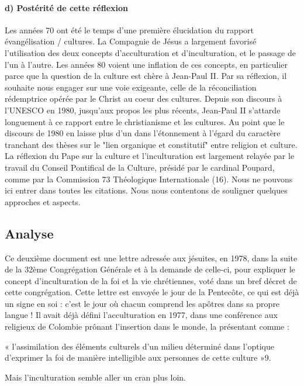 \paragraph{d) Postérité de cette réflexion
}
Les années 70 ont été le temps d'une première élucidation du rapport
évangélisation / cultures. La Compagnie de Jésus a largement favorisé l'utilisation des
deux concepts d'acculturation et d'inculturation, et le passage de l'un à l'autre. Les
années 80 voient une inflation de ces concepts, en particulier parce que la question de la
culture est chère à Jean-Paul II. Par sa réflexion, il souhaite nous engager sur une voie
exigeante, celle de la réconciliation rédemptrice opérée par le Christ au coeur des cultures.
Depuis son discours à l'UNESCO en 1980, jusqu'aux propos les plus récents, Jean-Paul
II s'attarde longuement à ce rapport entre le christianisme et les cultures. Au point que le
discours de 1980 en laisse plus d'un dans l'étonnement à l'égard du caractère tranchant
des thèses sur le "lien organique et constitutif" entre religion et culture. La réflexion du
Pape sur la culture et l'inculturation est largement relayée par le travail du Conseil
Pontifical de la Culture, présidé par le cardinal Poupard, comme par la Commission
73
Théologique Internationale (16). Nous ne pouvons ici entrer dans toutes les citations.
Nous nous contentons de souligner quelques approches et aspects. 


\subsection{Analyse}

Ce deuxième document est une lettre adressée aux jésuites, en 1978, dans la suite de la 32ème Congrégation Générale et à la demande de celle-ci, pour expliquer le concept d’inculturation de la foi et la vie chrétiennes, voté dans un bref décret de cette congrégation. Cette lettre est envoyée le jour de la Pentecôte, ce qui est déjà un signe en soi : c’est le jour où chacun comprend les apôtres dans sa propre langue ! Il avait déjà défini l’acculturation en 1977, dans une conférence aux religieux de Colombie prônant l’insertion dans le monde, la présentant comme :

\begin{Def}[acculturation]
    « l’assimilation des éléments culturels d’un milieu déterminé dans l’optique d’exprimer la foi de manière intelligible aux personnes de cette culture »9.
\end{Def}
 Mais l’inculturation semble aller un cran plus loin.

